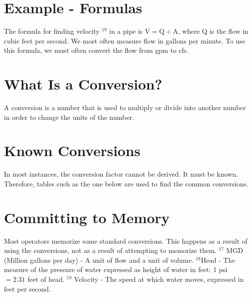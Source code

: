 \section{Example - Formulas}
The formula for finding velocity ${ }^{19}$ in a pipe is $\mathrm{V}=\mathrm{Q} \div \mathrm{A}$, where $\mathrm{Q}$ is the flow in cubic feet per second. We most often measure flow in gallons per minute. To use this formula, we must often convert the flow from gpm to cfs.

\section{What Is a Conversion?}
A conversion is a number that is used to multiply or divide into another number in order to change the units of the number.

\section{Known Conversions}
In most instances, the conversion factor cannot be derived. It must be known. Therefore, tables such as the one below are used to find the common conversions.

\section{Committing to Memory}
Most operators memorize some standard conversions. This happens as a result of using the conversions, not as a result of attempting to memorize them. ${ }^{17}$ MGD (Million gallons per day) - A unit of flow and a unit of volume. ${ }^{18} \mathrm{Head}$ - The measure of the pressure of water expressed as height of water in feet: 1 psi $=2.31$ feet of head. ${ }^{19}$ Velocity - The speed at which water moves, expressed in feet per second.

